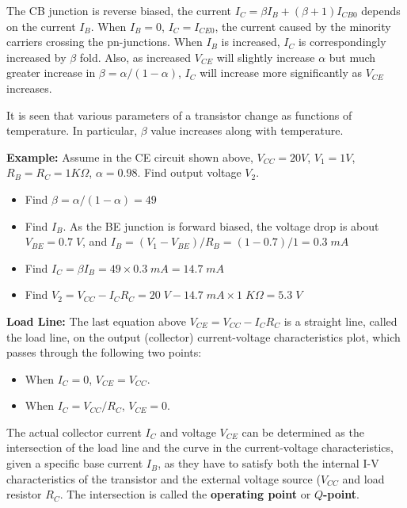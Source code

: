 \begin{itemize}
\begin{itemize}
The CB junction is reverse biased, the current $I_C=\beta I_B+(\beta+1)I_{CB0}$
depends on the current $I_B$. When $I_B=0$, $I_C=I_{CE0}$, the current caused 
by the minority carriers crossing the pn-junctions. When $I_B$ is increased,
$I_C$ is correspondingly increased by $\beta$ fold. Also, as increased $V_{CE}$
will slightly increase $\alpha$ but much greater increase in 
$\beta=\alpha/(1-\alpha)$, $I_C$ will increase more significantly as $V_{CE}$
increases.


\end{itemize}

It is seen that various parameters of a transistor change as functions of
temperature. In particular, $\beta$ value increases along with temperature.

{\bf Example:} Assume in the CE circuit shown above, $V_{CC}=20V$, $V_1=1V$, 
$R_B=R_C=1K\Omega$, $\alpha=0.98$. Find output voltage $V_2$.
\begin{itemize}
\item Find $\beta=\alpha/(1-\alpha)=49$
\item Find $I_B$. As the BE junction is forward biased, the voltage drop is
	about $V_{BE}=0.7\;V$, and $I_B=(V_1-V_{BE})/R_B=(1-0.7)/1=0.3\;mA$
\item Find $I_C=\beta I_B=49\times 0.3\;mA=14.7\; mA$
\item Find $V_2=V_{CC}-I_C R_C=20\;V-14.7\;mA \times 1\;K\Omega=5.3\;V$
\end{itemize}

{\bf Load Line:} The last equation above $V_{CE}=V_{CC}-I_C R_C$ is a 
straight line, called the load line, on the output (collector) current-voltage
characteristics plot, which passes through the following two points:
\begin{itemize}
\item When $I_C=0$, $V_{CE}=V_{CC}$. 
\item When $I_C=V_{CC}/R_C$, $V_{CE}=0$.
\end{itemize}
The actual collector current $I_C$ and voltage $V_{CE}$ can be determined 
as the intersection of the load line and the curve in the current-voltage
characteristics, given a specific base current $I_B$, as they have to satisfy 
both the internal I-V characteristics of the transistor and the external 
voltage source ($V_{CC}$ and load resistor $R_C$. The intersection is called
the {\bf operating point} or {\bf $Q$-point}.


\end{itemize}
